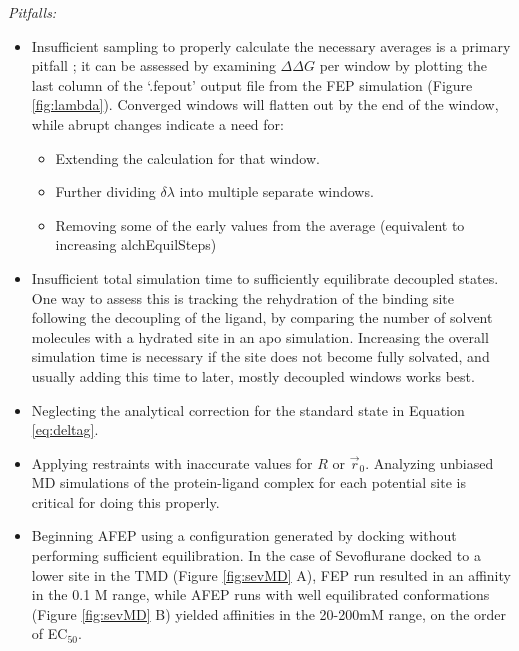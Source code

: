 \documentclass[12pt]{article}
\begin{document}
\noindent\textit{Pitfalls:}
\begin{itemize}
	\item Insufficient sampling to properly calculate the necessary averages is a primary pitfall \cite{Pohorille2010}; it can be assessed by examining $\Delta\Delta G$ per window by plotting the last column of the `.fepout' output file from the FEP simulation (Figure \ref{fig:lambda}).  Converged windows will flatten out by the end of the window, while abrupt changes indicate a need for:
		\begin{itemize}
		\item Extending the calculation for that window. 
		\item Further dividing $\delta$$\lambda$ into multiple separate windows.  
		\item Removing some of the early values from the average (equivalent to increasing alchEquilSteps)
		\end{itemize}
	\item Insufficient total simulation time to sufficiently equilibrate decoupled states. One way to assess this is tracking the rehydration of the binding site following the decoupling of the ligand, by comparing the number of solvent molecules with a hydrated site in an apo simulation. Increasing the overall simulation time is necessary if the site does not become fully solvated, and usually adding this time to later, mostly decoupled windows works best.
	\item Neglecting the analytical correction for the standard state in Equation \ref{eq:deltag}.  
	\item Applying restraints with inaccurate values for $R$ or $\vec{r}_{0}$.  Analyzing unbiased MD simulations of the protein-ligand complex for each potential site is critical for doing this properly.  
	\item Beginning AFEP using a configuration generated by docking without performing sufficient equilibration. In the case of Sevoflurane docked to a lower site in the TMD (Figure \ref{fig:sevMD} A), FEP run resulted in an affinity in the 0.1 M range, while AFEP runs with well equilibrated conformations (Figure \ref{fig:sevMD} B) yielded affinities in the 20-200mM range, on the order of EC$_{50}$.  
	\end{itemize}
\end{document}
